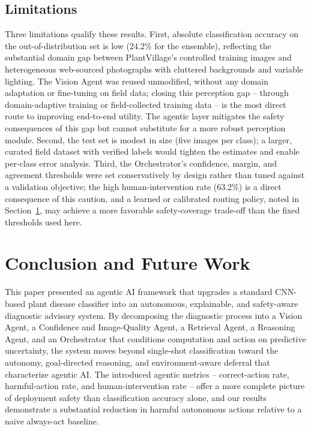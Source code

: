 \documentclass[conference]{IEEEtran}
\begin{document}
\subsection{Limitations}
Three limitations qualify these results. First, absolute classification accuracy on the out-of-distribution set is low (24.2\% for the ensemble), reflecting the substantial domain gap between PlantVillage's controlled training images and heterogeneous web-sourced photographs with cluttered backgrounds and variable lighting. The Vision Agent was reused unmodified, without any domain adaptation or fine-tuning on field data; closing this perception gap -- through domain-adaptive training or field-collected training data -- is the most direct route to improving end-to-end utility. The agentic layer mitigates the safety consequences of this gap but cannot substitute for a more robust perception module. Second, the test set is modest in size (five images per class); a larger, curated field dataset with verified labels would tighten the estimates and enable per-class error analysis. Third, the Orchestrator's confidence, margin, and agreement thresholds were set conservatively by design rather than tuned against a validation objective; the high human-intervention rate (63.2\%) is a direct consequence of this caution, and a learned or calibrated routing policy, noted in Section~\ref{sec:conclusion}, may achieve a more favorable safety-coverage trade-off than the fixed thresholds used here.

\section{Conclusion and Future Work}
\label{sec:conclusion}

This paper presented an agentic AI framework that upgrades a standard CNN-based plant disease classifier into an autonomous, explainable, and safety-aware diagnostic advisory system. By decomposing the diagnostic process into a Vision Agent, a Confidence and Image-Quality Agent, a Retrieval Agent, a Reasoning Agent, and an Orchestrator that conditions computation and action on predictive uncertainty, the system moves beyond single-shot classification toward the autonomy, goal-directed reasoning, and environment-aware deferral that characterize agentic AI. The introduced agentic metrics -- correct-action rate, harmful-action rate, and human-intervention rate -- offer a more complete picture of deployment safety than classification accuracy alone, and our results demonstrate a substantial reduction in harmful autonomous actions relative to a naive always-act baseline.
\end{document}
